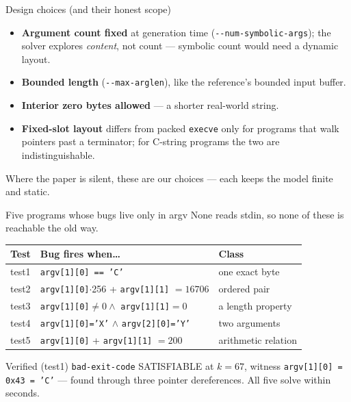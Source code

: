 \documentclass[aspectratio=169]{beamer}
\newcommand{\lab}[1]{{\footnotesize\color{ink!65}#1}}
\newcommand{\key}[1]{\textbf{\color{accentdk}#1}}
\begin{document}
\begin{frame}{Design choices (and their honest scope)}
  \begin{itemize}\setlength\itemsep{0.35em}\footnotesize
    \item \key{Argument count fixed} at generation time
          (\texttt{-{}-num-symbolic-args}); the solver explores \emph{content},
          not count --- symbolic count would need a dynamic layout.
    \item \key{Bounded length} (\texttt{-{}-max-arglen}), like the reference's
          bounded input buffer.
    \item \key{Interior zero bytes allowed} --- a shorter real-world string.
    \item \key{Fixed-slot layout} differs from packed \texttt{execve} only for
          programs that walk pointers past a terminator; for C-string programs
          the two are indistinguishable.
  \end{itemize}
  \vfill
  \lab{Where the paper is silent, these are our choices --- each keeps the
       model finite and static.}
\end{frame}

\begin{frame}{Five programs whose bugs live only in argv}
  None reads stdin, so none of these is reachable the old way.
  \vspace{0.2em}
  \centering\scriptsize
  \begin{tabular}{lll}
    \toprule
    Test & Bug fires when\dots & Class\\
    \midrule
    test1 & \texttt{argv[1][0] == 'C'} & one exact byte\\
    test2 & \texttt{argv[1][0]}$\cdot$256 + \texttt{argv[1][1]} $= 16706$ & ordered pair\\
    test3 & \texttt{argv[1][0]}$\neq 0 \wedge$ \texttt{argv[1][1]}$=0$ & a length property\\
    test4 & \texttt{argv[1][0]='X'} $\wedge$ \texttt{argv[2][0]='Y'} & two arguments\\
    test5 & \texttt{argv[1][0]} + \texttt{argv[1][1]} $= 200$ & arithmetic relation\\
    \bottomrule
  \end{tabular}
  \vspace{0.4em}
  \begin{block}{Verified (test1)}
    \footnotesize \texttt{bad-exit-code} SATISFIABLE at $k=67$, witness
    \texttt{argv[1][0] = 0x43 = 'C'} --- found through three pointer
    dereferences. All five solve within seconds.
  \end{block}
\end{frame}
\end{document}
